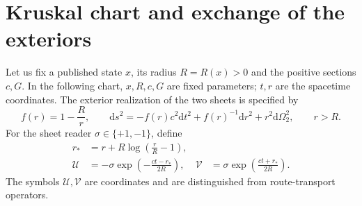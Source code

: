 \section{Kruskal chart and exchange of the exteriors}
\label{x_reciprocidad:vii:subsec:kruskal-dos-hojas}

Let us fix a published state \(x\), its radius \(R=R(x)>0\) and the
positive sections \(c,G\). In the following chart, \(x,R,c,G\)
are fixed parameters; \(t,r\) are the spacetime coordinates.
The exterior realization of the two sheets is specified by
\begin{equation}
 f(r)=1-\frac Rr,\qquad
 \mathrm ds^2=-f(r)c^2\mathrm dt^2+f(r)^{-1}\mathrm dr^2
                 +r^2\mathrm d\Omega_2^2,\qquad r>R.
 \label{x_reciprocidad:vii:eq:metrica-exterior}
\end{equation}
For the sheet reader \(\sigma\in\{+1,-1\}\), define
\begin{align}
 r_*&=r+R\log\left(\frac rR-1\right),\\
 \mathcal U&=-\sigma\exp\left(-\frac{ct-r_*}{2R}\right),&
 \mathcal V&=\sigma\exp\left(\frac{ct+r_*}{2R}\right).
 \label{x_reciprocidad:vii:eq:carta-kruskal}
\end{align}
The symbols \(\mathcal U,\mathcal V\) are coordinates and are
distinguished from route-transport operators.

